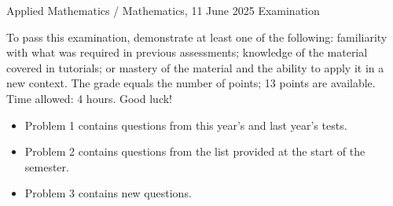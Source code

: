 \documentclass[a4paper]{report}
\begin{document}
\noindent Applied Mathematics / Mathematics, 11 June 2025 \hfill Examination
\hrulefill
\begin{it}
To pass this examination, demonstrate at least one of the following: familiarity with what was required in previous assessments; knowledge of the material covered in tutorials; or mastery of the material and the ability to apply it in a new context.
The grade equals the number of points; 13 points are available. Time allowed: 4 hours. Good luck!
\begin{itemize}
\item Problem 1 contains questions from this year's and last year's tests.
\item Problem 2 contains questions from the list provided at the start of the semester.
\item Problem 3 contains new questions.
\end{itemize}
\end{it}
\end{document}
